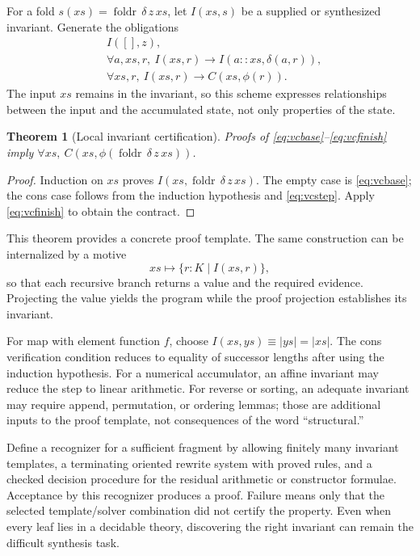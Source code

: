 \documentclass[11pt,a4paper]{article}
\newtheorem{theorem}[proposition]{Theorem}
\theoremstyle{definition}
\theoremstyle{remark}
\newcommand{\foldr}{\operatorname{foldr}}
\begin{document}
For a fold $s(xs)=\foldr\,\delta\,z\,xs$, let $I(xs,s)$ be a supplied or
synthesized invariant. Generate the obligations
\begin{align}
 &I([],z),\label{eq:vcbase}\\
 &\forall a,xs,r,\ I(xs,r)\to I(a::xs,\delta(a,r)),\label{eq:vcstep}\\
 &\forall xs,r,\ I(xs,r)\to C(xs,\phi(r)).\label{eq:vcfinish}
\end{align}
The input $xs$ remains in the invariant, so this scheme expresses relationships
between the input and the accumulated state, not only properties of the state.

\begin{theorem}[Local invariant certification]\label{thm:invariant}
Proofs of \eqref{eq:vcbase}--\eqref{eq:vcfinish} imply
$\forall xs,\ C(xs,\phi(\foldr\,\delta\,z\,xs))$.
\end{theorem}
\begin{proof}
Induction on $xs$ proves $I(xs,\foldr\,\delta\,z\,xs)$. The empty case is
\eqref{eq:vcbase}; the cons case follows from the induction hypothesis and
\eqref{eq:vcstep}. Apply \eqref{eq:vcfinish} to obtain the contract.
\end{proof}

This theorem provides a concrete proof template. The same construction can
be internalized by a motive
\[
 xs\longmapsto\{r:K\mid I(xs,r)\},
\]
so that each recursive branch returns a value and the required evidence.
Projecting the value yields the program while the proof projection establishes
its invariant.

For map with element function $f$, choose
$I(xs,ys)\equiv |ys|=|xs|$. The cons verification condition reduces to equality
of successor lengths after using the induction hypothesis. For a numerical
accumulator, an affine invariant may reduce the step to linear arithmetic.
For reverse or sorting, an adequate invariant may require append, permutation,
or ordering lemmas; those are additional inputs to the proof template, not
consequences of the word ``structural.''

Define a recognizer for a sufficient fragment by allowing finitely many
invariant templates, a terminating oriented rewrite system with proved rules,
and a checked decision procedure for the residual arithmetic or constructor
formulae. Acceptance by this recognizer produces a proof. Failure means only
that the selected template/solver combination did not certify the property.
Even when every leaf lies in a decidable theory, discovering the right
invariant can remain the difficult synthesis task.
\end{document}
